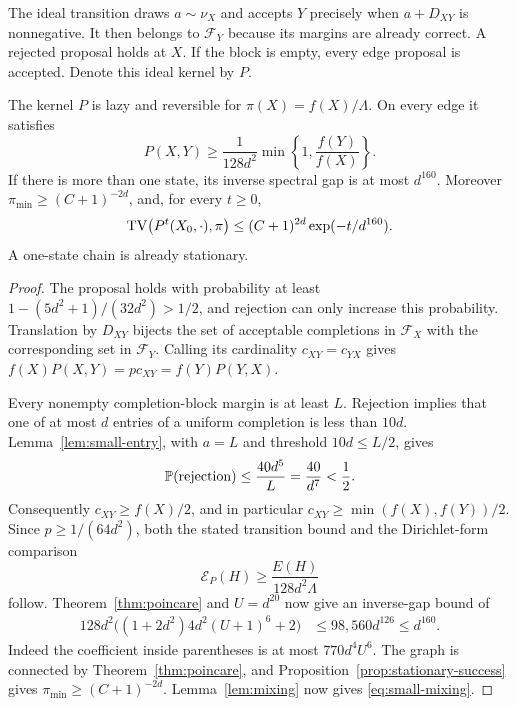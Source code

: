 The ideal transition draws $a\sim\nu_X$ and accepts $Y$ precisely when
$a+D_{XY}$ is nonnegative. It then belongs to $\mathcal F_Y$ because its
margins are already correct. A rejected proposal holds at $X$. If the block
is empty, every edge proposal is accepted. Denote this ideal kernel by $P$.

\begin{proposition}\label{prop:small-chain}
The kernel $P$ is lazy and reversible for $\pi(X)=f(X)/\Lambda$. On every
edge it satisfies
\[
 P(X,Y)\ge \frac{1}{128d^2}
                  \min\left\{1,\frac{f(Y)}{f(X)}\right\}.
\]
If there is more than one state, its inverse spectral gap is at most
$d^{160}$. Moreover
$\pi_{\min}\ge(C+1)^{-2d}$, and, for every $t\ge0$,
\begin{equation}\label{eq:small-mixing}
 \operatorname{TV}\bigl(P^t(X_0,\cdot),\pi\bigr)
 \le (C+1)^{2d}\exp(-t/d^{160}).
\end{equation}
A one-state chain is already stationary.
\end{proposition}

\begin{proof}
The proposal holds with probability at least
$1-(5d^2+1)/(32d^2)>1/2$, and rejection can only increase this probability.
Translation by $D_{XY}$ bijects the set of acceptable completions in
$\mathcal F_X$ with the corresponding set in $\mathcal F_Y$. Calling its
cardinality $c_{XY}=c_{YX}$ gives
$f(X)P(X,Y)=p c_{XY}=f(Y)P(Y,X)$.

Every nonempty completion-block margin is at least $L$. Rejection implies
that one of at most $d$ entries of a uniform completion is less than $10d$.
Lemma~\ref{lem:small-entry}, with $a=L$ and threshold $10d\le L/2$, gives
\[
 \mathbb{P}(\text{rejection})\le \frac{40d^5}{L}
             =\frac{40}{d^7}<\frac12.
\]
Consequently $c_{XY}\ge f(X)/2$, and in particular
$c_{XY}\ge\min(f(X),f(Y))/2$. Since $p\ge1/(64d^2)$, both the stated
transition bound and the Dirichlet-form comparison
\[
 \mathcal E_P(H)\ge \frac{E(H)}{128d^2\Lambda}
\]
follow. Theorem~\ref{thm:poincare} and $U=d^{20}$ now give an inverse-gap
bound of
\begin{align*}
128d^2\bigl((1+2d^2)4d^2(U+1)^6+2\bigr)
 &\le 98{,}560d^{126}\le d^{160}.
\end{align*}
Indeed the coefficient inside parentheses is at most $770d^4U^6$.
The graph is connected by Theorem~\ref{thm:poincare}, and
Proposition~\ref{prop:stationary-success} gives
$\pi_{\min}\ge(C+1)^{-2d}$. Lemma~\ref{lem:mixing} now gives
\eqref{eq:small-mixing}.
\end{proof}


